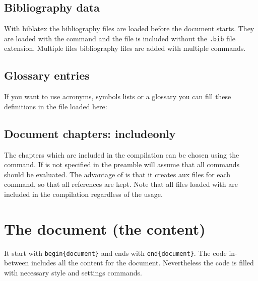 \subsection{Bibliography data}
\label{sec:preamble:bibfiles}
With biblatex the bibliography files are loaded before the document starts. 
They are loaded with the command  and the file is included without the \texttt{.bib} file extension. Multiple files bibliography files are added with multiple  commands.

\subsection{Glossary entries}
\label{sec:document:acronyms}
If you want to use acronyms, symbols lists or a glossary you can fill these definitions in the file 
 loaded here:
%
\subsection{Document chapters: includeonly}
\label{sec:preamble:includeonly}
The chapters which are included in the compilation can be chosen using the  command. If  is not specified in the preamble \latex will assume that all  commands should be evaluated. The advantage of  is that it creates aux files for each  command, so that all references are kept. Note that all files loaded with  are included in the compilation regardless of the  usage.


\section{The document (the content)}
\label{sec:doc:document}
It start with \texttt{\bs{}begin\{document\}} and ends with \texttt{\bs{}end\{document\}}.
The code in-between includes all the content for the document. Nevertheless the code is filled with necessary style and settings commands.

